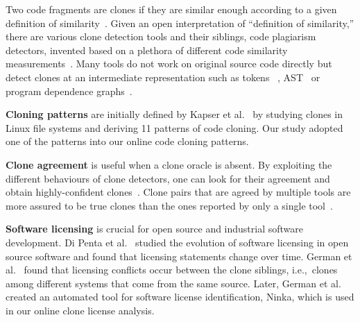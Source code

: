 \documentclass[10pt,journal,compsoc]{IEEEtran}
\begin{document}
Two code fragments are clones if they are similar enough according to
a given definition of similarity~\cite{Bellon2007}. Given an open
interpretation of ``definition of similarity,'' there are various
clone detection tools and their siblings, code plagiarism detectors,
invented based on a plethora of different code similarity
measurements~\cite{Roy2008, Ragkhitwetsagul2016,emse,Svajlenko2014}. 
Many tools do not work on original source code directly but detect clones
at an intermediate representation such as tokens ~\cite{Sajnani2016,Kamiya2002,Li2006,Gode2009,Burrows2007, Smith2009, Duric2012, Prechelt2002, Schleimer2003}, AST~\cite{Baxter1998,Jiang2007a} or program dependence
graphs~\cite{Krinke2001,Komondoor2001}. 

\textbf{Cloning patterns} are initially defined 
by Kapser et al.~\cite{Kapser2003,Kapser2008} by studying clones in 
Linux file systems and deriving 11 patterns of code cloning. 
Our study adopted one of the patterns into our online code cloning patterns.

\textbf{Clone agreement} is useful when a clone oracle is
absent. %
By exploiting the different behaviours of clone detectors,
one can look for their agreement and obtain
highly-confident clones~\cite{Bellon2007,Wang2013}. %
Clone pairs that are agreed by multiple tools are more assured to be true
clones than the ones reported by only a single
tool~\cite{Wang2013,cr2016ssbse,Funaro2010}. 

\textbf{Software licensing} is crucial for open source and 
industrial software development. Di Penta et al.~\cite{DiPenta2010}
studied the evolution of software licensing in open source 
software and found that licensing statements change over 
time. German et al.~\cite{German2009} found that licensing 
conflicts occur between the clone siblings, i.e.,~clones among 
different systems that come from the same source. Later, 
German et al.~\cite{German2010} created an automated tool 
for software license identification, Ninka, which is used
in our online clone license analysis. 
\end{document}
